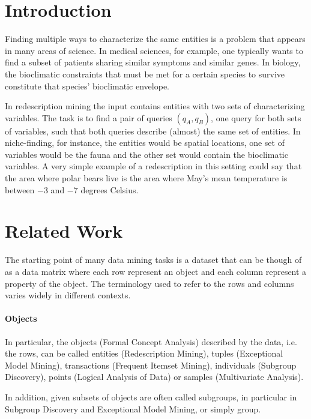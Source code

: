 \documentclass[a4paper,10pt]{article}
\begin{document}
\section{Introduction}
Finding multiple ways to characterize the same entities is a problem that
appears in many areas of science. In medical sciences, for example, one 
typically wants to find a subset of patients sharing similar symptoms and
similar genes. In biology, the bioclimatic constraints that must be met 
for a certain species to survive constitute that species' bioclimatic envelope.

In redescription mining the input contains entities with two sets of
characterizing variables. The task is to find a pair of queries
$(q_A,q_B)$, one query for both sets of variables, such that both
queries describe (almost) the same set of entities. In niche-finding,
for instance, the entities would be spatial locations, one set of
variables would be the fauna and the other set would contain the
bioclimatic variables. A very simple example of a redescription in
this setting could say that the area where polar bears live is the
area where May's mean temperature is between $-3$ and $-7$ degrees
Celsius.

\section{Related Work}

The starting point of many data mining tasks is a dataset that can be
though of as a data matrix where each row represent an object and
each column represent a property of the object.  The terminology used
to refer to the rows and columns varies widely in different contexts.

\paragraph{Objects}
In particular, the objects (Formal Concept Analysis) described by the
data, i.e. the rows, can be called entities (Redescription Mining),
tuples (Exceptional Model Mining), transactions (Frequent Itemset
Mining), individuals (Subgroup Discovery), points (Logical Analysis of
Data) or samples (Multivariate Analysis).  

In addition, given subsets of objects are often called subgroups, in
particular in Subgroup Discovery and Exceptional Model Mining, or
simply group.
\end{document}
